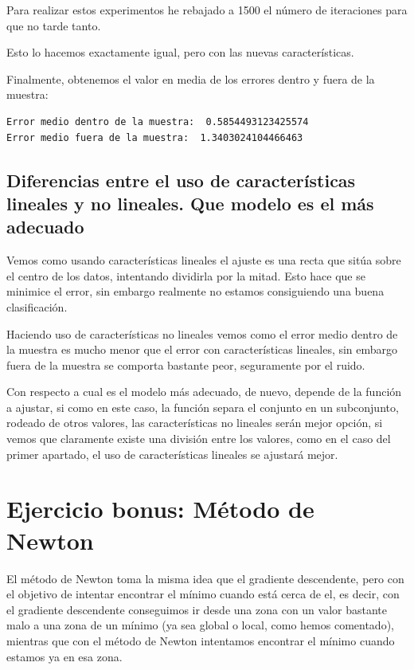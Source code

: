 \documentclass[12pt, spanish]{article}
\begin{document}
Para realizar estos experimentos he rebajado a 1500 el número de iteraciones para que no tarde tanto.

Esto lo hacemos exactamente igual, pero con las nuevas características.

Finalmente, obtenemos el valor en media de los errores dentro y fuera de la muestra:

\begin{lstlisting}
Error medio dentro de la muestra:  0.5854493123425574
Error medio fuera de la muestra:  1.3403024104466463
\end{lstlisting}



\subsection{Diferencias entre el uso de características lineales y no lineales. Que modelo es el más adecuado}

Vemos como usando características lineales el ajuste es una recta que sitúa sobre el centro de los datos, intentando dividirla por la mitad. Esto hace que se minimice el error, sin embargo realmente no estamos consiguiendo una buena clasificación.

Haciendo uso de características no lineales vemos como el error medio dentro de la muestra es mucho menor que el error con características lineales, sin embargo fuera de la muestra se comporta bastante peor, seguramente por el ruido.

Con respecto a cual es el modelo más adecuado, de nuevo, depende de la función a ajustar, si como en este caso, la función separa el conjunto en un subconjunto, rodeado de otros valores, las características no lineales serán mejor opción, si vemos que claramente existe una división entre los valores, como en el caso del primer apartado, el uso de características lineales se ajustará mejor.

\newpage

\section{Ejercicio bonus: Método de Newton}

El método de Newton toma la misma idea que el gradiente descendente, pero con el objetivo de intentar encontrar el mínimo cuando está cerca de el, es decir, con el gradiente descendente conseguimos ir desde una zona con un valor bastante malo a una zona de un mínimo (ya sea global o local, como hemos comentado), mientras que con el método de Newton intentamos encontrar el mínimo cuando estamos ya en esa zona\cite{teoria}.
\end{document}

